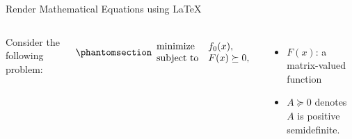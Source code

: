 \documentclass[
  10pt,
  ignorenonframetext,
  serif,onlymath]{beamer}
\newenvironment{Shaded}{}{}
\newcommand{\ExtensionTok}[1]{#1}
\newcommand{\KeywordTok}[1]{\textcolor[rgb]{0.00,0.44,0.13}{\textbf{#1}}}
\newcommand{\NormalTok}[1]{#1}
\newcommand{\SpecialCharTok}[1]{\textcolor[rgb]{0.25,0.44,0.63}{#1}}
\newcommand{\SpecialStringTok}[1]{\textcolor[rgb]{0.73,0.40,0.53}{#1}}
\providecommand{\tightlist}{%
  \setlength{\itemsep}{0pt}\setlength{\parskip}{0pt}}
\begin{document}
\begin{frame}[fragile]{Render Mathematical Equations using LaTeX}
\label{render-mathematical-equations-using-latex}
\begin{columns}
\scriptsize

\begin{Shaded}
\end{Shaded}


Consider the following problem:

\begin{equation}\phantomsection\label{eq:semidef}{\begin{array}{ll}
  \text{minimize}    & f_0(x), \\
  \text{subject to}  & F(x) \succeq 0,
\end{array}}\end{equation}

\begin{itemize}
\tightlist
\item
  \(F(x)\): a matrix-valued function
\item
  \(A \succeq 0\) denotes \(A\) is positive semidefinite.
\end{itemize}

\end{columns}
\end{frame}
\end{document}
